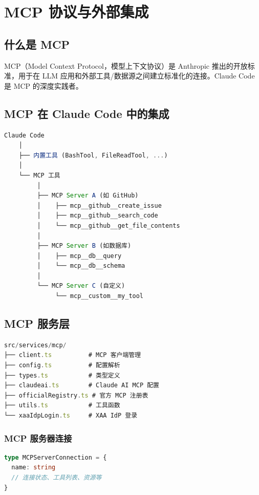 \chapter{MCP 协议与外部集成}

\section{什么是 MCP}

MCP（Model Context Protocol，模型上下文协议）是 Anthropic 推出的开放标准，用于在 LLM 应用和外部工具/数据源之间建立标准化的连接。Claude Code 是 MCP 的深度实践者。

\section{MCP 在 Claude Code 中的集成}

\begin{lstlisting}[language=TypeScript,breaklines=true]
Claude Code
    │
    ├── 内置工具 (BashTool, FileReadTool, ...)
    │
    └── MCP 工具
         │
         ├── MCP Server A (如 GitHub)
         │    ├── mcp__github__create_issue
         │    ├── mcp__github__search_code
         │    └── mcp__github__get_file_contents
         │
         ├── MCP Server B (如数据库)
         │    ├── mcp__db__query
         │    └── mcp__db__schema
         │
         └── MCP Server C (自定义)
              └── mcp__custom__my_tool
\end{lstlisting}

\section{MCP 服务层}

\begin{lstlisting}[language=TypeScript,breaklines=true]
src/services/mcp/
├── client.ts          # MCP 客户端管理
├── config.ts          # 配置解析
├── types.ts           # 类型定义
├── claudeai.ts        # Claude AI MCP 配置
├── officialRegistry.ts # 官方 MCP 注册表
├── utils.ts           # 工具函数
└── xaaIdpLogin.ts     # XAA IdP 登录
\end{lstlisting}

\subsection{MCP 服务器连接}

\begin{lstlisting}[language=TypeScript,breaklines=true]
type MCPServerConnection = {
  name: string
  // 连接状态、工具列表、资源等
}
\end{lstlisting}

